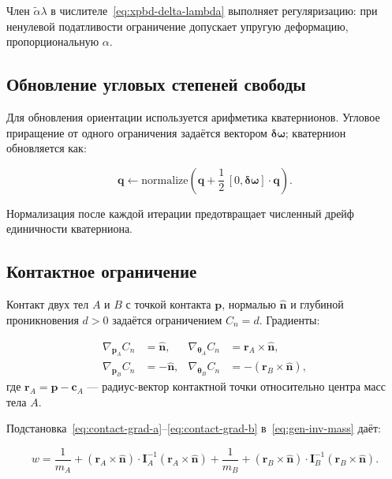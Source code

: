 Член $\tilde{\alpha}\lambda$ в числителе~\eqref{eq:xpbd-delta-lambda} выполняет регуляризацию: при ненулевой 
податливости ограничение допускает упругую деформацию, пропорциональную $\alpha$.

\subsection{Обновление угловых степеней свободы}

Для обновления ориентации используется арифметика кватернионов. Угловое приращение от одного ограничения 
задаётся вектором $\boldsymbol{\delta\omega}$; кватернион обновляется как:

\begin{equation}
  \mathbf{q} \leftarrow \text{normalize}\!\left(\mathbf{q} + \frac{1}{2}\,[0, \boldsymbol{\delta\omega}]\cdot\mathbf{q}\right).
  \label{eq:quat-update}
\end{equation}

Нормализация после каждой итерации предотвращает численный дрейф единичности кватерниона.

\subsection{Контактное ограничение}

Контакт двух тел $A$ и $B$ с точкой контакта $\mathbf{p}$, нормалью $\hat{\mathbf{n}}$ и глубиной 
проникновения $d > 0$ задаётся ограничением $C_n = d$. Градиенты:

\begin{align}
  \nabla_{\mathbf{p}_A} C_n &= \hat{\mathbf{n}}, &
  \nabla_{\boldsymbol{\theta}_A} C_n &= \mathbf{r}_A \times \hat{\mathbf{n}},
  \label{eq:contact-grad-a} \\
  \nabla_{\mathbf{p}_B} C_n &= -\hat{\mathbf{n}}, &
  \nabla_{\boldsymbol{\theta}_B} C_n &= -(\mathbf{r}_B \times \hat{\mathbf{n}}),
  \label{eq:contact-grad-b}
\end{align}
где $\mathbf{r}_A = \mathbf{p} - \mathbf{c}_A$ --- радиус-вектор контактной точки относительно центра масс тела $A$.

Подстановка~\eqref{eq:contact-grad-a}--\eqref{eq:contact-grad-b} в~\eqref{eq:gen-inv-mass} даёт:

\begin{equation}
  w = \frac{1}{m_A} + (\mathbf{r}_A \times \hat{\mathbf{n}}) \cdot \mathbf{I}_A^{-1}(\mathbf{r}_A \times \hat{\mathbf{n}}) +
      \frac{1}{m_B} + (\mathbf{r}_B \times \hat{\mathbf{n}}) \cdot \mathbf{I}_B^{-1}(\mathbf{r}_B \times \hat{\mathbf{n}}).
\end{equation}


